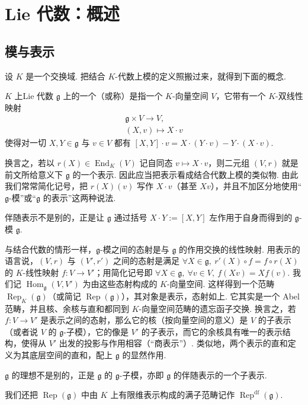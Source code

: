 \chapter{Lie 代数：概述}\label{chap:ssl-2}
\section{模与表示}\label{sec:ssl-2-1}
设 $K$ 是一个交换域. 把结合 $K$-代数上模的定义照搬过来，就得到下面的概念.
\begin{definition}\label{def:ssl-2-1-1}
$K$ 上Lie 代数 $\mathfrak{g}$ 上的一个（或称）是指一个 $K$-向量空间 $V$，它带有一个 $K$-双线性映射
\[\begin{gathered}
\mathfrak{g} \times V \longrightarrow V,\\
(X, v) \longmapsto X \cdot v
\end{gathered}\]
使得对一切 $X, Y \in \mathfrak{g}$ 与 $v \in V$ 都有 $[X, Y] \cdot v = X \cdot (Y \cdot v) - Y \cdot (X \cdot v)$.
\end{definition}
换言之，若以 $r(X) \in \operatorname{End}_K(V)$ 记自同态 $v \mapsto X \cdot v$，则二元组 $(V, r)$ 就是前文所给意义下 $\mathfrak{g}$ 的一个表示. 因此应当把表示看成结合代数上模的类似物. 由此我们常常简化记号，把 $r(X)(v)$ 写作 $X \cdot v$（甚至 $Xv$），并且不加区分地使用``$\mathfrak{g}$-模''或``$\mathfrak{g}$ 的表示''这两种说法.
\begin{example*}
伴随表示不是别的，正是让 $\mathfrak{g}$ 通过括号 $X \cdot Y := [X, Y]$ 左作用于自身而得到的 $\mathfrak{g}$-模 $\mathfrak{g}$.
\end{example*}

\begin{numpara}\label{np:ssl-2-1-2}
与结合代数的情形一样，$\mathfrak{g}$-模之间的态射是与 $\mathfrak{g}$ 的作用交换的线性映射. 用表示的语言说，$(V, r)$ 与 $(V', r')$ 之间的态射是满足 $\forall X \in \mathfrak{g},\ r'(X) \circ f = f \circ r(X)$ 的 $K$-线性映射 $f : V \longrightarrow V'$；用简化记号即 $\forall X \in \mathfrak{g},\ \forall v \in V,\ f(Xv) = Xf(v)$. 我们记 $\operatorname{Hom}_{\mathfrak{g}}(V, V')$ 为由这些态射构成的 $K$-向量空间.
这样得到一个范畴 $\operatorname{Rep}_K(\mathfrak{g})$（或简记 $\operatorname{Rep}(\mathfrak{g})$），其对象是表示，态射如上. 它其实是一个 Abel 范畴，并且核、余核与直和都同到 $K$-向量空间范畴的遗忘函子交换. 换言之，若 $f : V \longrightarrow V'$ 是表示之间的态射，那么它的核（按向量空间的意义）是 $V$ 的子表示（或者说 $V$ 的 $\mathfrak{g}$-子模），它的像是 $V'$ 的子表示，而它的余核具有唯一的表示结构，使得从 $V'$ 出发的投影与作用相容（``商表示''）. 类似地，两个表示的直和定义为其底层空间的直和，配上 $\mathfrak{g}$ 的显然作用.
\begin{example*}
$\mathfrak{g}$ 的理想不是别的，正是 $\mathfrak{g}$ 的 $\mathfrak{g}$-子模，亦即 $\mathfrak{g}$ 的伴随表示的一个子表示.
\end{example*}
我们还把 $\operatorname{Rep}(\mathfrak{g})$ 中由 $K$ 上有限维表示构成的满子范畴记作 $\operatorname{Rep}^{\mathrm{df}}(\mathfrak{g})$.
\end{numpara}

